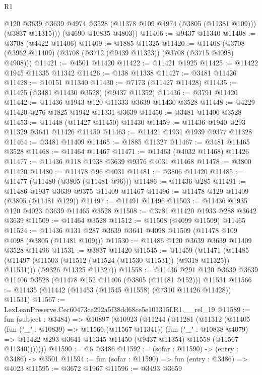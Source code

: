 \begin{lexlean}{R1}
\begin{coremodule}
          @120
          @3639
          @3639
          @4974
          @3528
          (@11378 @109 @4974 (@3805 (@11381 @109)))
          (@3837 @11315)))
      (@4690 @10835 @4803))
@11406 := @9437 @11340
@11408 := @3708 (@4422 @11406)
@11409 := @1885 @11325
@11420 := @11408 (@3708 (@3962 @11409) (@3708 (@3712 (@9439 @11323)) (@3708 (@3715 @4098) @4908)))
@11421 := @4501 @11420
@11422 := @11421 @1925
@11425 := @11422 @1945 @11335 @11342
@11426 := @138 @11338
@11427 := @3481 @11426
@11428 := @10151 @11340
@11430 := @7173 (@11427 @11428)
@11435 := @11425 (@3481 @11430 @3528) (@9437 @11352)
@11436 := @3791 @11420
@11442 := @11436 @1943 @120 @11333 @3639 @11430 @3528
@11448 := @4229 @11420 @276 @1825 @1942 @11331 @3639
@11450 := @3481 @11406 @3528
@11453 := @11448 (@11427 @11450) @11430
@11459 := @11436 @1940 @293 @11329 @3641 @11426 @11450
@11463 := @11421 @1931 @1939 @9377 @11328
@11464 := @3481 @11409
@11465 := @1885 @11327
@11467 := @3481 @11465 @3528
@11468 := @11464 @11467
@11471 := @11463 (@4032 @11468) @11426
@11477 := @11436 @118 @1938 @3639 @9376 @4031 @11468
@11478 := @3800 @11420
@11480 := @11478 @96 @4031
@11481 := @3806 @11420
@11485 := @11477 (@11480 (@3805 (@11481 @96)))
@11486 := @11436 @285
@11491 := @11486 @1937 @3639 @9375 @11409 @11467
@11496 := @11478 @129 @11409 (@3805 (@11481 @129))
@11497 := @11491 @11496
@11503 := @11436 @1935 @120 @4023 @3639 @11465 @3528
@11508 := @3781 @11420 @1933 @288 @3642 @3639
@11509 := @11464 @3528
@11512 := @11508 (@4099 @11509) @11465
@11524 := @11436 @131 @287 @3639 @3641 @4098 @11509 (@11478 @109 @4098 (@3805 (@11481 @109)))
@11530 := @11486 @120 @3639 @3639 @11409 @3528 @11496
@11531 := @3837 @11420
@11545 := @11459
    (@11471
      (@11485 (@11497 (@11503 (@11512 (@11524 (@11530 @11531)) (@9318 @11325)) @11531)))
      (@9326 @11325 @11327))
@11558 := @11436
    @291
    @120
    @3639
    @3639
    @11406
    @3528
    (@11478 @152 @11406 (@3805 (@11481 @152)))
    @11531
@11566 := @11435 (@11442 (@11453 (@11545 @11558) (@7310 @11426 @11428)) @11531)
@11567 := LexLeanPreserve.Cec60473ce292a5f38dd68ce5e101315f.R1.__rel_19
@11589 := fun (subject : @3484) =>
  @10897
    (@10923
      (@11244
        (@11281
          (@11312
            (@11405
              (fun ("_" : @10839) => @11566 (@11567 @11341))
              (fun ("_" : @10838 @4079) =>
              @11422 @293 @3641 @11345 @11450 (@9437 @11354) @11558 (@11567 @11340)))))))
@11590 := @6 @3486
@11592 := (sofar : @11590) -> (entry : @3486) -> @3501
@11594 := fun (sofar : @11590) => fun (entry : @3486) => @4023
@11595 := @3672 @1967
@11596 := @3493 @3659

\end{coremodule}
\end{lexlean}
